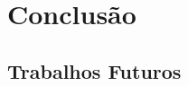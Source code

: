 \chapter[Conclusão]{Conclusão}
\label{chap:conclusao}

\lipsum[1 - 3]

\section{Trabalhos Futuros}
\label{sec:trabalhosfuturos}

\lipsum[4 - 6]
